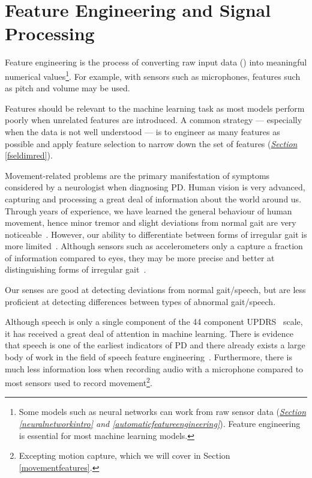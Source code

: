 \documentclass[12pt, twoside]{book}
\renewcommand\emph[1]{\textit{\color{USred}{#1}}}
\begin{document}
\section{Feature Engineering and Signal Processing}
\label{featureengineeringsigprocs}
Feature engineering is the process of converting raw input data (\emph{signals}) into meaningful numerical values\footnote{Some models such as neural networks can work from raw sensor data (\textit{\hyperref[neuralnetworkintro]{Section} \ref{neuralnetworkintro} and \ref{automaticfeatureengineering}}). Feature engineering is essential for most machine learning models.}. For example, with sensors such as microphones, features such as pitch and volume may be used. 

Features should be relevant to the machine learning task as most models perform poorly when unrelated features are introduced. A common strategy --- especially when the data is not well understood --- is to engineer as many features as possible and apply feature selection to narrow down the set of features (\textit{\hyperref[fseldimred]{Section}} \ref{fseldimred}). 


Movement-related problems are the primary manifestation of symptoms considered by a neurologist when diagnosing PD. Human vision is very advanced, capturing and processing a great deal of information about the world around us. Through years of experience, we have learned the general behaviour of human movement, hence minor tremor and slight deviations from normal gait are very noticeable~\cite{troje2002decomposing}. However, our ability to differentiate between forms of irregular gait is more limited~\cite{parkinsonismdifferential1}. Although sensors such as accelerometers only a capture a fraction of information compared to eyes, they may be more precise and better at distinguishing forms of irregular gait~\cite{parkinsonismdifferential2}.

\begin{highlight}
Our senses are good at detecting deviations from normal gait/speech, but are less proficient at detecting differences between types of abnormal gait/speech. 
\end{highlight}

Although speech is only a single component of the 44 component UPDRS~\cite{updrs} scale, it has received a great deal of attention in machine learning. There is evidence that speech is one of the earliest indicators of PD \cite{earlyvowel} and there already exists a large body of work in the field of speech feature engineering~\cite{ostextbook}. Furthermore, there is much less information loss when recording audio with a microphone compared to most sensors used to record movement\footnote{Excepting motion capture, which we will cover in Section \ref{movementfeatures}.}. 
\end{document}
